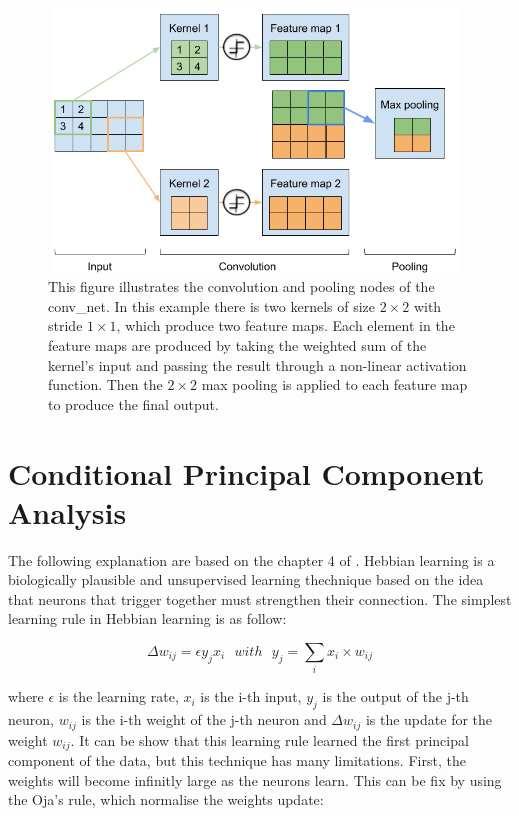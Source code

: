 \documentclass[11pt]{report}
\begin{document}
\begin{figure}[h]
\centering
\includegraphics[width=11cm, height=7cm]{conv_net}
\caption[Illustration of convolution and max pooling layers]{This figure illustrates the convolution and pooling nodes of the \acrshort{conv_net}. In this example there is two kernels of size $2\times2$ with stride $1\times1$, which produce two feature maps. Each element in the feature maps are produced by taking the weighted sum of the kernel's input and passing the result through a non-linear activation function. Then the $2\times2$ max pooling is applied to each feature map to produce the final output.}
\label{fig:conv_net}
\end{figure}

\section{Conditional Principal Component Analysis}

The following explanation are based on the chapter 4 of \textcite{OReilly:2000:CEC:557205:chap4}. Hebbian learning is a biologically plausible and unsupervised learning thechnique based on the idea that neurons that trigger together must strengthen their connection. The simplest learning rule in Hebbian learning is as follow:

\begin{equation}
\Delta w_{ij} = \epsilon y_jx_i\ \ \ with\ \ \ y_j = \sum_{i}{x_i \times w_{ij}}
\end{equation}

\noindent where $\epsilon$ is the learning rate, $x_i$ is the i-th input, $y_j$ is the output of the j-th neuron, $w_{ij}$ is the i-th weight of the j-th neuron and $\Delta w_{ij}$ is the update for the weight $w_{ij}$. It can be show that this learning rule learned the first principal component of the data, but this technique has many limitations. First, the weights will become infinitly large as the neurons learn. This can be fix by using the Oja's rule, which normalise the weights update:
\end{document}
